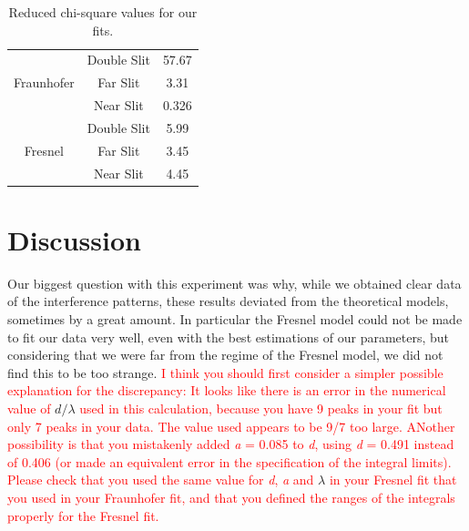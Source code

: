 \documentclass[prb,preprint]{revtex4-1}
\begin{document}
\begin{table}[h!]
\centering
\caption{Reduced chi-square values for our fits. }
\begin{ruledtabular}
\begin{tabular}{ccc}
 \multirow{3}{*}{Fraunhofer} & Double Slit &57.67                                            \\
                            & Far Slit    & 3.31                                           \\
                            & Near Slit   & 0.326                                 \\
\multirow{3}{*}{Fresnel}    & Double Slit &          5.99                                    \\
                            & Far Slit    & 3.45                                           \\
                            & Near Slit   & 4.45                                      
\end{tabular}
\end{ruledtabular}
\label{chi-square}
\end{table}


\section{Discussion}

Our biggest question with this experiment was why, while we obtained clear data of the interference patterns, these results deviated from the theoretical models, sometimes by a great amount.  In particular the Fresnel model could not be made to fit our data very well, even with the best estimations of our parameters, but considering that we were far from the regime of the Fresnel model, we did not find this to be too strange. \textcolor{red}{I think you should first consider a simpler possible explanation for the discrepancy: It looks like there is an error in the numerical value of }$d/{\lambda}$ \textcolor{red}{used in this calculation, because you have 9 peaks in your fit but only 7 peaks in your data. The value used appears to be 9/7 too large. ANother possibility is that you mistakenly added \textit{a}  = 0.085 to \textit{d},  using \textit{d} = 0.491 instead of 0.406 (or made an equivalent error in the specification of the integral limits).  Please check that you used the same value for \textit{d}, \textit{a} and }$\lambda$ \textcolor{red}{in your Fresnel fit that you used in your Fraunhofer fit, and that you defined the ranges of the integrals properly for the Fresnel fit. }
\end{document}
